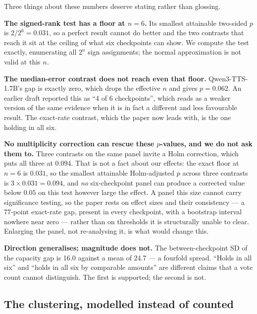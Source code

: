 \documentclass[11pt]{article}
\begin{document}
Three things about these numbers deserve stating rather than glossing.

\noindent\textbf{The signed-rank test has a floor at $n=6$.} Its smallest
attainable two-sided $p$ is $2/2^6 = 0.031$, so a perfect result cannot do better
and the two contrasts that reach it sit at the ceiling of what six checkpoints
can show. We compute the test exactly, enumerating all $2^n$ sign assignments;
the normal approximation is not valid at this $n$.

\noindent\textbf{The median-error contrast does not reach even that floor.}
Qwen3-TTS-1.7B's gap is exactly zero, which drops the effective $n$ and gives
$p=0.062$. An earlier draft reported this as ``4 of 6 checkpoints'', which
reads as a weaker version of the same evidence when it is in fact a different and
less favourable result. The exact-rate contrast, which the paper now leads with,
is the one holding in all six.

\noindent\textbf{No multiplicity correction can rescue these $p$-values, and we
do not ask them to.} Three contrasts on the same panel invite a Holm correction,
which puts all three at $0.094$. That is not a fact about our effects: the exact
floor at $n=6$ is $0.031$, so the smallest attainable Holm-adjusted $p$ across
three contrasts is $3\times0.031=0.094$, and \emph{no} six-checkpoint panel can
produce a corrected value below $0.05$ on this test however large the effect. A
panel this size cannot carry significance testing, so the paper rests on effect
sizes and their consistency --- a $77$-point exact-rate gap, present in every
checkpoint, with a bootstrap interval nowhere near zero --- rather than on
thresholds it is structurally unable to clear. Enlarging the panel, not
re-analysing it, is what would change this.

\noindent\textbf{Direction generalises; magnitude does not.} The
between-checkpoint SD of the capacity gap is 16.0 against a mean of
24.7 --- a fourfold spread. ``Holds in all six'' and ``holds in all six by
comparable amounts'' are different claims that a vote count cannot distinguish.
The first is supported; the second is not.

\subsection{The clustering, modelled instead of counted}
\label{sec:s11-hier}
\end{document}
